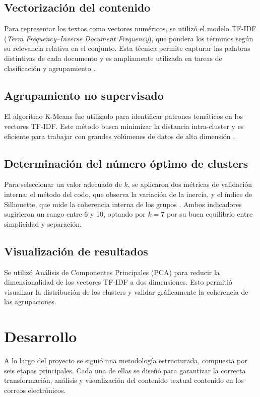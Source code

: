 \documentclass[journal]{IEEEtran} %
\begin{document}
\subsection{Vectorización del contenido}
Para representar los textos como vectores numéricos, se utilizó el modelo TF-IDF (\textit{Term Frequency–Inverse Document Frequency}), que pondera los términos según su relevancia relativa en el conjunto. Esta técnica permite capturar las palabras distintivas de cada documento y es ampliamente utilizada en tareas de clasificación y agrupamiento \cite{ramos2003using}.

\subsection{Agrupamiento no supervisado}
El algoritmo K-Means fue utilizado para identificar patrones temáticos en los vectores TF-IDF. Este método busca minimizar la distancia intra-cluster y es eficiente para trabajar con grandes volúmenes de datos de alta dimensión \cite{lloyd1982least}.

\subsection{Determinación del número óptimo de clusters}
Para seleccionar un valor adecuado de $k$, se aplicaron dos métricas de validación interna: el método del codo, que observa la variación de la inercia, y el índice de Silhouette, que mide la coherencia interna de los grupos \cite{rousseeuw1987silhouettes}. Ambos indicadores sugirieron un rango entre 6 y 10, optando por $k=7$ por su buen equilibrio entre simplicidad y separación.

\subsection{Visualización de resultados}
Se utilizó Análisis de Componentes Principales (PCA) para reducir la dimensionalidad de los vectores TF-IDF a dos dimensiones. Esto permitió visualizar la distribución de los clusters y validar gráficamente la coherencia de las agrupaciones.

\section{Desarrollo}

A lo largo del proyecto se siguió una metodología estructurada, compuesta por seis etapas principales. Cada una de ellas se diseñó para garantizar la correcta transformación, análisis y visualización del contenido textual contenido en los correos electrónicos.
\end{document}
